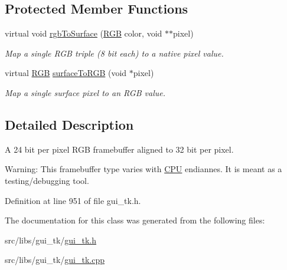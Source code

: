 \subsection*{Protected Member Functions}
\begin{DoxyCompactItemize}
\item 
\hypertarget{classGUI_1_1ScreenRGB32le_ab7657b6a960ab081be4c9adecdaa0750}{virtual void \hyperlink{classGUI_1_1ScreenRGB32le_ab7657b6a960ab081be4c9adecdaa0750}{rgb\-To\-Surface} (\hyperlink{namespaceGUI_aeafd135255365f3584da0e982fc79466}{R\-G\-B} color, void $\ast$$\ast$pixel)}\label{classGUI_1_1ScreenRGB32le_ab7657b6a960ab081be4c9adecdaa0750}

\begin{DoxyCompactList}\small\item\em Map a single R\-G\-B triple (8 bit each) to a native pixel value. \end{DoxyCompactList}\item 
\hypertarget{classGUI_1_1ScreenRGB32le_ad6fbb227845ecca03bf04d344a40dce9}{virtual \hyperlink{namespaceGUI_aeafd135255365f3584da0e982fc79466}{R\-G\-B} \hyperlink{classGUI_1_1ScreenRGB32le_ad6fbb227845ecca03bf04d344a40dce9}{surface\-To\-R\-G\-B} (void $\ast$pixel)}\label{classGUI_1_1ScreenRGB32le_ad6fbb227845ecca03bf04d344a40dce9}

\begin{DoxyCompactList}\small\item\em Map a single surface pixel to an R\-G\-B value. \end{DoxyCompactList}\end{DoxyCompactItemize}


\subsection{Detailed Description}
A 24 bit per pixel R\-G\-B framebuffer aligned to 32 bit per pixel. 

Warning\-: This framebuffer type varies with \hyperlink{classCPU}{C\-P\-U} endiannes. It is meant as a testing/debugging tool. 

Definition at line 951 of file gui\-\_\-tk.\-h.



The documentation for this class was generated from the following files\-:\begin{DoxyCompactItemize}
\item 
src/libs/gui\-\_\-tk/\hyperlink{gui__tk_8h}{gui\-\_\-tk.\-h}\item 
src/libs/gui\-\_\-tk/\hyperlink{gui__tk_8cpp}{gui\-\_\-tk.\-cpp}\end{DoxyCompactItemize}
